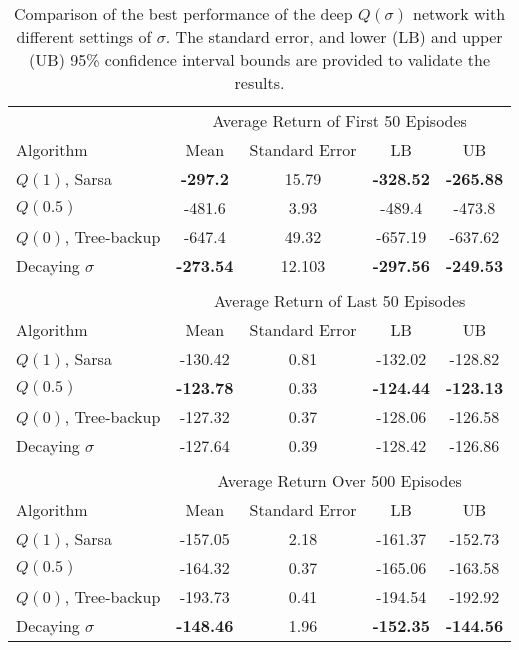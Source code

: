 \begin{table}[t] 
\caption[Comparison of the Best Performance of the Deep $Q(\sigma)$ Network with Different Settings of $\sigma$]{Comparison of the best performance of the deep $Q(\sigma)$ network with different settings of $\sigma$.
The standard error, and lower (LB) and upper (UB) 95\% confidence interval bounds are provided to validate the results.
}
\label{tbl:best_nstep_results}
\begin{center}
\begin{tabular}{lcccc}
\toprule
& \multicolumn{4}{c}{Average Return of First 50 Episodes} \\
\cmidrule{2-5}
Algorithm & Mean & Standard Error & LB & UB \\
\midrule
$Q(1)$, Sarsa 		& \textbf{-297.2}	& 15.79	    & \textbf{-328.52}	& \textbf{-265.88}   \\
$Q(0.5)$  			& -481.6	        & 3.93	    & -489.4	        & -473.8    \\
$Q(0)$, Tree-backup & -647.4	        & 49.32	    & -657.19	        & -637.62   \\
Decaying $\sigma$ 	& \textbf{-273.54}	& 12.103	& \textbf{-297.56}	& \textbf{-249.53}   \\
\bottomrule
&&&& \\
\toprule
& \multicolumn{4}{c}{Average Return of Last 50 Episodes} \\
\cmidrule{2-5}
Algorithm & Mean & Standard Error & LB & UB \\
\midrule
$Q(1)$, Sarsa 		& -130.42	        & 0.81	    & -132.02	        & -128.82   \\
$Q(0.5)$  			& \textbf{-123.78}	& 0.33	    & \textbf{-124.44}	& \textbf{-123.13}   \\
$Q(0)$, Tree-backup & -127.32	        & 0.37	    & -128.06	        & -126.58   \\
Decaying $\sigma$ 	& -127.64	        & 0.39	    & -128.42	        & -126.86   \\
\bottomrule
&&&& \\
\toprule
& \multicolumn{4}{c}{Average Return Over 500 Episodes} \\
\cmidrule{2-5}
Algorithm & Mean & Standard Error & LB & UB \\
\midrule
$Q(1)$, Sarsa 		& -157.05           & 2.18	    & -161.37	        & -152.73   \\
$Q(0.5)$  			& -164.32	        & 0.37	    & -165.06	        & -163.58   \\
$Q(0)$, Tree-backup & -193.73	        & 0.41	    & -194.54	        & -192.92   \\
Decaying $\sigma$ 	& \textbf{-148.46}	& 1.96	    & \textbf{-152.35}	& \textbf{-144.56}   \\
\bottomrule
\end{tabular}
\end{center}
\end{table}

